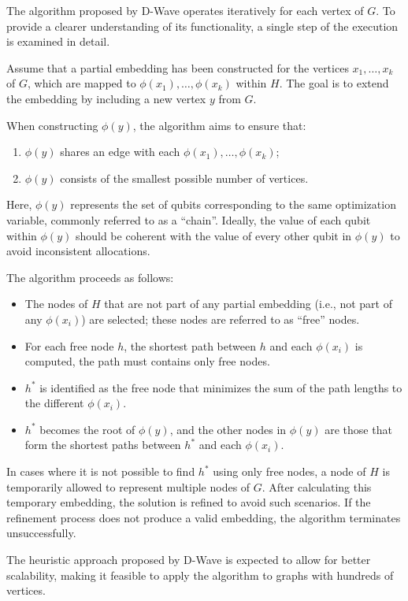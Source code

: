 The algorithm proposed by D-Wave operates iteratively for each vertex of $G$. To provide a clearer understanding of its functionality, a single step of the execution is examined in detail.

Assume that a partial embedding has been constructed for the vertices $x_1, \dots, x_k$ of $G$, which are mapped to $\phi(x_1), \dots, \phi(x_k)$ within $H$. 
The goal is to extend the embedding by including a new vertex $y$ from $G$.

When constructing $\phi(y)$, the algorithm aims to ensure that:
\begin{enumerate}
    \item $\phi(y)$ shares an edge with each $\phi(x_1), \dots, \phi(x_k)$;
    \item $\phi(y)$ consists of the smallest possible number of vertices.
\end{enumerate}

Here, $\phi(y)$ represents the set of qubits corresponding to the same optimization variable, commonly referred to as a ``chain''. 
Ideally, the value of each qubit within $\phi(y)$ should be coherent with the value of every other qubit in $\phi(y)$ to avoid inconsistent allocations.

The algorithm proceeds as follows:
\begin{itemize}
    \item The nodes of $H$ that are not part of any partial embedding (i.e., not part of any $\phi(x_i)$) are selected; these nodes are referred to as ``free'' nodes.
    \item For each free node $h$, the shortest path between $h$ and each $\phi(x_i)$ is computed, the path must contains only free nodes.
    \item $h^*$ is identified as the free node that minimizes the sum of the path lengths to the different $\phi(x_i)$.
    \item $h^*$ becomes the root of $\phi(y)$, and the other nodes in $\phi(y)$ are those that form the shortest paths between $h^*$ and each $\phi(x_i)$.
\end{itemize}

In cases where it is not possible to find $h^*$ using only free nodes, a node of $H$ is temporarily allowed to represent multiple nodes of $G$. 
After calculating this temporary embedding, the solution is refined to avoid such scenarios. If the refinement process does not produce a valid embedding, the algorithm terminates unsuccessfully.

The heuristic approach proposed by D-Wave is expected to allow for better scalability, making it feasible to apply the algorithm to graphs with hundreds of vertices.
